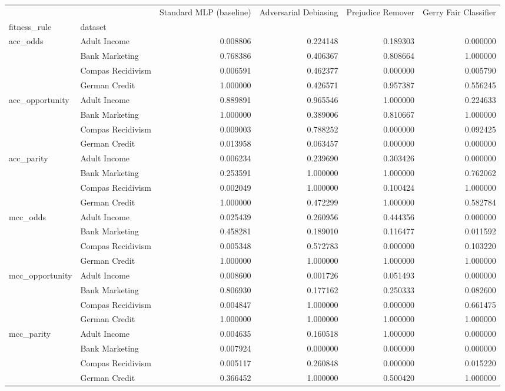 \begin{tabular}{llrrrr}
\toprule
 &  & Standard MLP (baseline) & Adversarial Debiasing & Prejudice Remover & Gerry Fair Classifier \\
fitness_rule & dataset &  &  &  &  \\
\midrule
\multirow[t]{4}{*}{acc_odds} & Adult Income & 0.008806 & 0.224148 & 0.189303 & 0.000000 \\
 & Bank Marketing & 0.768386 & 0.406367 & 0.808664 & 1.000000 \\
 & Compas Recidivism & 0.006591 & 0.462377 & 0.000000 & 0.005790 \\
 & German Credit & 1.000000 & 0.426571 & 0.957387 & 0.556245 \\
\cline{1-6}
\multirow[t]{4}{*}{acc_opportunity} & Adult Income & 0.889891 & 0.965546 & 1.000000 & 0.224633 \\
 & Bank Marketing & 1.000000 & 0.389006 & 0.810667 & 1.000000 \\
 & Compas Recidivism & 0.009003 & 0.788252 & 0.000000 & 0.092425 \\
 & German Credit & 0.013958 & 0.063457 & 0.000000 & 0.000000 \\
\cline{1-6}
\multirow[t]{4}{*}{acc_parity} & Adult Income & 0.006234 & 0.239690 & 0.303426 & 0.000000 \\
 & Bank Marketing & 0.253591 & 1.000000 & 1.000000 & 0.762062 \\
 & Compas Recidivism & 0.002049 & 1.000000 & 0.100424 & 1.000000 \\
 & German Credit & 1.000000 & 0.472299 & 1.000000 & 0.582784 \\
\cline{1-6}
\multirow[t]{4}{*}{mcc_odds} & Adult Income & 0.025439 & 0.260956 & 0.444356 & 0.000000 \\
 & Bank Marketing & 0.458281 & 0.189010 & 0.116477 & 0.011592 \\
 & Compas Recidivism & 0.005348 & 0.572783 & 0.000000 & 0.103220 \\
 & German Credit & 1.000000 & 1.000000 & 1.000000 & 1.000000 \\
\cline{1-6}
\multirow[t]{4}{*}{mcc_opportunity} & Adult Income & 0.008600 & 0.001726 & 0.051493 & 0.000000 \\
 & Bank Marketing & 0.806930 & 0.177162 & 0.250333 & 0.082600 \\
 & Compas Recidivism & 0.004847 & 1.000000 & 0.000000 & 0.661475 \\
 & German Credit & 1.000000 & 1.000000 & 1.000000 & 1.000000 \\
\cline{1-6}
\multirow[t]{4}{*}{mcc_parity} & Adult Income & 0.004635 & 0.160518 & 1.000000 & 0.000000 \\
 & Bank Marketing & 0.007924 & 0.000000 & 0.000000 & 0.000000 \\
 & Compas Recidivism & 0.005117 & 0.260848 & 0.000000 & 0.015220 \\
 & German Credit & 0.366452 & 1.000000 & 0.500420 & 1.000000 \\
\cline{1-6}
\bottomrule
\end{tabular}
